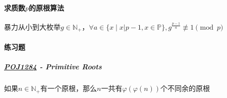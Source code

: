 \documentclass[]{cpp}
\begin{document}
\paragraph{求质数$p$的原根算法}
	暴力从小到大枚举$g\in\mathbb{N_+}$，$\forall a\in\{x\;|\;x|p-1,x\in\mathbb{P}\},g^{\frac{p-1}{a}}\not\equiv1\pmod{p}$
\paragraph{练习题}
\subparagraph{\href{http://poj.org/problem?id=1284}{POJ1284} - Primitive Roots} 如果$n\in\mathbb{N_+}$有一个原根，那么$n$一共有$\varphi(\varphi(n))$个不同余的原根
\end{document}
